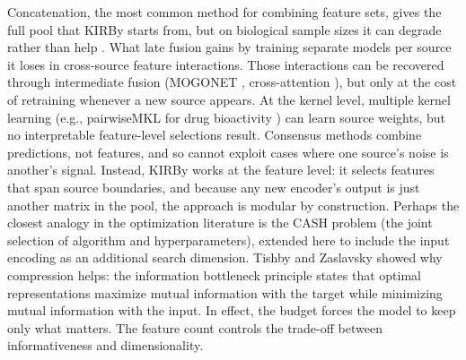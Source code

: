 {%

Concatenation, the most common method for combining feature sets, gives the full pool that KIRBy starts from, but on biological sample sizes it can degrade rather than help \citep{Bellman1961, Stahlschmidt2022}. What late fusion gains by training separate models per source \citep{Steyaert2023} it loses in cross-source feature interactions. Those interactions can be recovered through intermediate fusion (MOGONET \citep{Wang2021}, cross-attention \citep{Zhang2024}), but only at the cost of retraining whenever a new source appears. At the kernel level, multiple kernel learning \citep{Gonen2011} (e.g., pairwiseMKL for drug bioactivity \citep{Cichonska2018}) can learn source weights, but no interpretable feature-level selections result. Consensus methods \citep{Valsecchi2020} combine predictions, not features, and so cannot exploit cases where one source's noise is another's signal. Instead, KIRBy works at the feature level: it selects features that span source boundaries, and because any new encoder's output is just another matrix in the pool, the approach is modular by construction. Perhaps the closest analogy in the optimization literature is the CASH problem \citep{Thornton2013} (the joint selection of algorithm and hyperparameters), extended here to include the input encoding as an additional search dimension. Tishby and Zaslavsky \citep{Tishby2015} showed why compression helps: the information bottleneck principle states that optimal representations maximize mutual information with the target while minimizing mutual information with the input. In effect, the budget forces the model to keep only what matters. The feature count controls the trade-off between informativeness and dimensionality.

}

